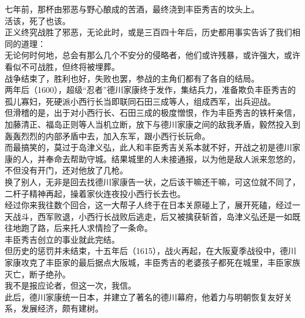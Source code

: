 \begin{multicols}{\theparacolNo}
七年前，那杯由邪恶与野心酿成的苦酒，最终浇到丰臣秀吉的坟头上。\\

活该，死了也该。\\

正义终究战胜了邪恶，无论此时，或是三百四十年后，历史都用事实告诉了我们相同的道理：\\

无论何时何地，总会有那么几个不安分的侵略者，他们或许残暴，或许强大，或许看似不可战胜，但终将被埋葬。\\

战争结束了，胜利也好，失败也罢，参战的主角们都有了各自的结局。\\

两年后（1600），超级“忍者”德川家康终于发作，集结兵力，准备欺负丰臣秀吉的孤儿寡妇，死硬派小西行长当即联同石田三成等人，组成西军，出兵迎战。\\

但滑稽的是，出于对小西行长、石田三成的极度憎恨，作为丰臣秀吉的铁杆亲信，加藤清正、福岛正则等人当机立断，放下与德川家康之间的敌我矛盾，毅然投入到轰轰烈烈的内部矛盾中去，加入东军，跟小西行长玩命。\\

而最搞笑的，莫过于岛津义弘，此人和丰臣秀吉关系本就不好，开战之初是德川家康的人，并奉命去帮助守城。结果城里的人未接通报，以为他是敌人派来忽悠的，不但没有开门，还对他放了几枪。\\

换了别人，无非是回去找德川家康告一状，之后该干嘛还干嘛，可这位就不同了，二杆子精神再起，操着家伙连夜投小西行长去也。\\

经过你来我往数个回合，这一大帮子人终于在日本关原碰上了，展开死磕，经过一天战斗，西军败退，小西行长战败后逃走，后又被擒获斩首，岛津义弘还是一如既往地跑了路，后来托人求情捡了一条命。\\

丰臣秀吉创立的事业就此完结。\\

但历史的惩罚并未结束，十五年后（1615），战火再起，在大阪夏季战役中，德川家康攻克了丰臣家的最后据点大阪城，丰臣秀吉的老婆孩子都死在城里，丰臣家族灭亡，断子绝孙。\\

我不是报应论者，但这一次，我信。\\

此后，德川家康统一日本，并建立了著名的德川幕府，他着力与明朝恢复友好关系，发展经济，颇有建树。\\


\end{multicols}
